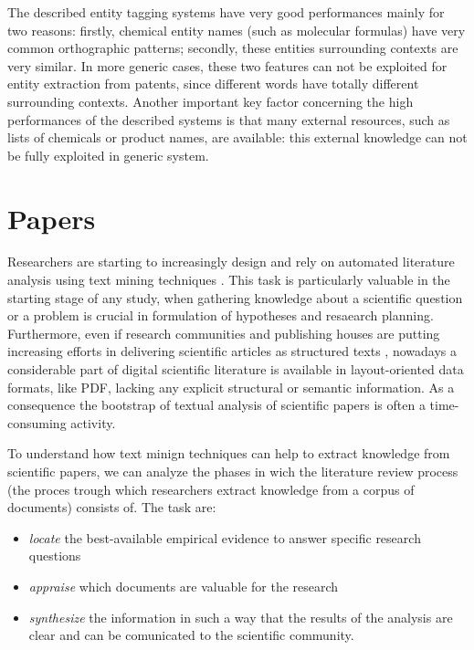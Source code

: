 \documentclass[b5paper,]{book}
\providecommand{\tightlist}{%
  \setlength{\itemsep}{0pt}\setlength{\parskip}{0pt}}
\theoremstyle{definition}
\theoremstyle{definition}
\theoremstyle{definition}
\theoremstyle{remark}
\begin{document}
The described entity tagging systems have very good performances mainly
for two reasons: firstly, chemical entity names (such as molecular
formulas) have very common orthographic patterns; secondly, these
entities surrounding contexts are very similar. In more generic cases,
these two features can not be exploited for entity extraction from
patents, since different words have totally different surrounding
contexts. Another important key factor concerning the high performances
of the described systems is that many external resources, such as lists
of chemicals or product names, are available: this external knowledge
can not be fully exploited in generic system.

\section{Papers}\label{sotadocumentspapers}

Researchers are starting to increasingly design and rely on automated
literature analysis using text mining techniques
\citep{nuzzo2010text, azoulay2006publicationharvester}. This task is
particularly valuable in the starting stage of any study, when gathering
knowledge about a scientific question or a problem is crucial in
formulation of hypotheses and resaearch planning. Furthermore, even if
research communities and publishing houses are putting increasing
efforts in delivering scientific articles as structured texts
\citep{poelmans2012text}, nowadays a considerable part of digital
scientific literature is available in layout-oriented data formats, like
PDF, lacking any explicit structural or semantic information. As a
consequence the bootstrap of textual analysis of scientific papers is
often a time-consuming activity.

To understand how text minign techniques can help to extract knowledge
from scientific papers, we can analyze the phases in wich the literature
review process (the proces trough which researchers extract knowledge
from a corpus of documents) consists of. The task are:

\begin{itemize}
\tightlist
\item
  \emph{locate} the best-available empirical evidence to answer specific
  research questions
\item
  \emph{appraise} which documents are valuable for the research
\item
  \emph{synthesize} the information in such a way that the results of
  the analysis are clear and can be comunicated to the scientific
  community.
\end{itemize}
\end{document}
